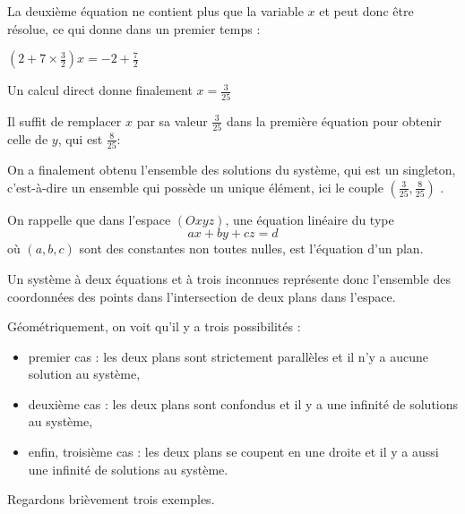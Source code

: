 \change

La deuxième équation ne contient plus que la variable \(x\) et peut donc être résolue, ce qui donne dans un premier temps :

$(2+7\times\frac32)x   =  -2 +\frac72$

\change

Un calcul direct donne finalement \(x=\frac{3}{25} \) 


\change

Il suffit de remplacer \(x\) par sa valeur \(\frac{3}{25} \) dans la première équation 
pour obtenir celle de \(y\), qui est \(\frac{8}{25} \): 


\change

On a finalement obtenu l'ensemble des solutions du système, qui est un singleton, c'est-à-dire un ensemble qui possède un unique élément, ici le couple \(\left(\frac{3}{25},\frac{8}{25}\right)\) .





\diapo

On rappelle que dans l'espace $(Oxyz)$, une équation linéaire du type
$$a x + b y  + c z = d$$
où $(a,b,c)$ sont des constantes non toutes nulles, est l'équation d'un plan.

\change

Un système à deux équations et à trois inconnues représente donc l'ensemble des coordonnées des points dans l'intersection de deux plans dans l'espace.

\change

Géométriquement, on voit qu'il y a trois possibilités :

\begin{itemize}
	\item premier cas : les deux plans sont strictement parallèles et il n'y a aucune solution au système,
	\item deuxième cas : les deux plans sont confondus et il y a une infinité de solutions au système,
	\item enfin, troisième cas : les deux plans se coupent en une droite et il y a aussi une infinité de solutions au système.
\end{itemize}
\diapo

Regardons brièvement trois exemples.

